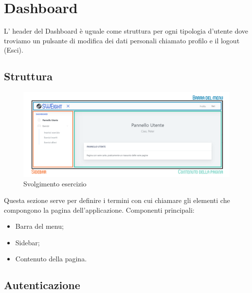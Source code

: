 \section{Dashboard}
  L' header del Dashboard è uguale come struttura per ogni tipologia d'utente dove troviamo un pulsante di modifica dei dati personali chiamato profilo e il logout (Esci).



\subsection{Struttura}
    \begin{figure}[H]
        \centering
        \includegraphics[width=17cm]{sez/img/istruzioni/dashboardMod.png} 
        \caption{Svolgimento esercizio}\label{fig:1}
    \end{figure}
  Questa sezione serve per definire i termini con cui chiamare gli elementi che compongono la pagina dell'applicazione.
    Componenti principali:
    \begin{itemize}
        \item Barra del menu;
        \item {Sidebar};
        \item Contenuto della pagina.
    \end{itemize}


\subsection{Autenticazione}
